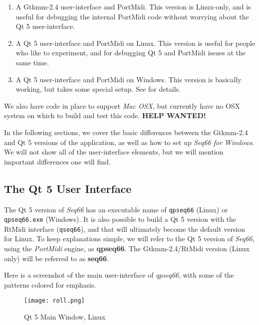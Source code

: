   \begin{enumerate}
      \item A Gtkmm-2.4 user-interface and PortMidi.  This version is
         Linux-only, and is useful for debugging the internal PortMidi code
         without worrying about the Qt 5 user-interface.
      \item A Qt 5 user-interface and PortMidi on Linux.  This version is
         useful for people who like to experiment, and for debugging Qt 5 and
         PortMidi issues at the same time.
      \item A Qt 5 user-interface and PortMidi on Windows.  This version is
         basically working, but takes some special setup.
         See  for details.
   \end{enumerate}

   We also have code in place to support
   \textsl{Mac OSX},
   but currently have no OSX system on which to build and test this
   code.  \textbf{HELP WANTED!}

   In the following sections, we cover the basic differences between the
   Gtkmm-2.4 and Qt 5 versions of the application, as well as how to set up
   \textsl{Seq66 for Windows}.
   We will not show all of the user-interface elements, but we will mention
   important differences one will find.

\subsection{The Qt 5 User Interface}
\label{subsec:qt_portmidi_qt5_user_interface}

   The Qt 5 version of \textsl{Seq66} has an executable name of
   \texttt{qpseq66} (Linux) or \texttt{qpseq66.exe} (Windows).
   It is also possible to build a Qt 5 version with the RtMidi interface
   (\texttt{qseq66}), and
   that will ultimately become the default version for Linux.
   To keep explanations simple, we will refer to the Qt 5 version of
   \textsl{Seq66}, using the \textsl{PortMidi} engine,
   as \textbf{qpseq66}.
   The Gtkmm-2.4/RtMidi version (Linux only) will be referred to as
   \textbf{seq66}.

   Here is a screenshot of the main user-interface of \textsl{qpseq66}, with
   some of the patterns colored for emphasis.

\begin{figure}[H]
   \centering 
   \texttt{[image: roll.png]}
   \caption{Qt 5 Main Window, Linux}
   \label{fig:qt5_main_window_linux}
\end{figure}


